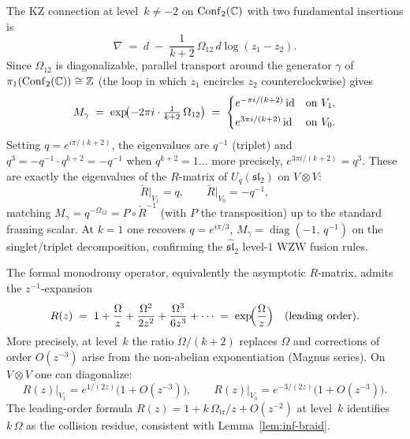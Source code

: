 \begin{computation}
The KZ connection at level~$k\neq -2$ on
$\mathrm{Conf}_2(\mathbb C)$ with two fundamental insertions is
\[
 \nabla \;=\; d \;-\; \frac{1}{k+2}\,\Omega_{12}\,d\log(z_1-z_2).
\]
Since $\Omega_{12}$ is diagonalizable, parallel transport around
the generator $\gamma$ of $\pi_1(\mathrm{Conf}_2(\mathbb C))\cong\mathbb Z$
(the loop in which $z_1$ encircles $z_2$ counterclockwise) gives
\begin{equation}%
 M_\gamma
 \;=\;
 \exp\!\bigl(-2\pi i\cdot\tfrac{1}{k+2}\,\Omega_{12}\bigr)
 \;=\;
 \begin{cases}
 e^{-\pi i/(k+2)}\,\id & \text{on } V_1, \\[3pt]
 e^{3\pi i/(k+2)}\,\id & \text{on } V_0.
 \end{cases}
\end{equation}
Setting $q=e^{i\pi/(k+2)}$, the eigenvalues are $q^{-1}$ (triplet) and $q^3=-q^{-1}\cdot q^{k+2}=-q^{-1}$
when $q^{k+2}=1$... more precisely, $e^{3\pi i/(k+2)}=q^3$.
These are exactly the eigenvalues of the $R$-matrix of $U_q(\mathfrak{sl}_2)$
on $V\otimes V$:
\[
 \check{R}\big|_{V_1}=q,\qquad \check{R}\big|_{V_0}=-q^{-1},
\]
matching $M_\gamma = q^{-\Omega_{12}} = P\circ \check{R}^{-1}$
(with $P$ the transposition) up to the standard framing scalar.
At $k=1$ one recovers $q=e^{i\pi/3}$, $M_\gamma=\operatorname{diag}(-1,\,q^{-1})$
on the singlet/triplet decomposition, confirming the
$\widehat{\mathfrak{sl}}_2$ level-$1$ WZW fusion rules.
\end{computation}

\begin{computation}
The formal monodromy operator, equivalently the asymptotic $R$-matrix,
admits the $z^{-1}$-expansion
\begin{equation}%
 R(z) \;=\; 1 + \frac{\Omega}{z} + \frac{\Omega^2}{2z^2} + \frac{\Omega^3}{6z^3}+\cdots
 \;=\; \exp\!\Bigl(\frac{\Omega}{z}\Bigr)\quad (\text{leading order}).
\end{equation}
More precisely, at level~$k$ the ratio $\Omega/(k+2)$ replaces $\Omega$
and corrections of order $O(z^{-3})$ arise from the non-abelian exponentiation
(Magnus series). On $V\otimes V$ one can diagonalize:
\[
 R(z)\big|_{V_1} = e^{1/(2z)}\bigl(1+O(z^{-3})\bigr),
 \qquad
 R(z)\big|_{V_0} = e^{-3/(2z)}\bigl(1+O(z^{-3})\bigr).
\]
The leading-order formula $R(z)=1+k\,\Omega_{\mathrm{tr}}/z+O(z^{-2})$
at level~$k$ identifies $k\,\Omega$ as the collision residue, consistent with
Lemma~\ref{lem:inf-braid}.
\end{computation}

